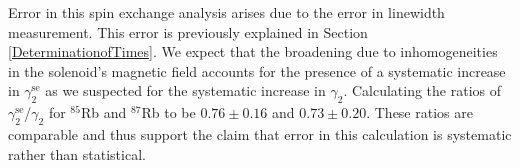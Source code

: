 Error in this spin exchange analysis arises due to the error in linewidth measurement.  This error is previously explained in Section \ref{DeterminationofTimes}.   We expect that the broadening due to inhomogeneities in the solenoid's magnetic field accounts for the presence of a systematic increase in $\gamma^{\mathrm{se}}_2$ as we suspected for the systematic increase in $\gamma_2$.  Calculating the ratios of $\gamma^{\mathrm{se}}_2$/$\gamma_2$ for $^{85}$Rb and $^{87}$Rb to be $0.76\pm 0.16$ and $0.73\pm 0.20$.  These ratios are comparable and thus support the claim that error in this calculation is systematic rather than statistical.